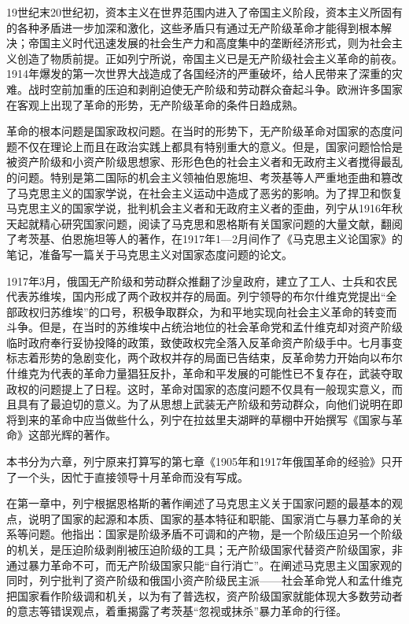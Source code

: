 \documentclass[UTF8, 12pt, a4paper]{ctexrep}
\begin{document}
19世纪末20世纪初，资本主义在世界范围内进入了帝国主义阶段，资本主义所固有的各种矛盾进一步加深和激化，这些矛盾只有通过无产阶级革命才能得到根本解决；帝国主义时代迅速发展的社会生产力和高度集中的垄断经济形式，则为社会主义创造了物质前提。正如列宁所说，帝国主义已是无产阶级社会主义革命的前夜。1914年爆发的第一次世界大战造成了各国经济的严重破坏，给人民带来了深重的灾难。战时空前加重的压迫和剥削迫使无产阶级和劳动群众奋起斗争。欧洲许多国家在客观上出现了革命的形势，无产阶级革命的条件日趋成熟。

革命的根本问题是国家政权问题。在当时的形势下，无产阶级革命对国家的态度问题不仅在理论上而且在政治实践上都具有特别重大的意义。但是，国家问题恰恰是被资产阶级和小资产阶级思想家、形形色色的社会主义者和无政府主义者搅得最乱的问题。特别是第二国际的机会主义领袖伯恩施坦、考茨基等人严重地歪曲和篡改了马克思主义的国家学说，在社会主义运动中造成了恶劣的影响。为了捍卫和恢复马克思主义的国家学说，批判机会主义者和无政府主义者的歪曲，列宁从1916年秋天起就精心研究国家问题，阅读了马克思和恩格斯有关国家问题的大量文献，翻阅了考茨基、伯恩施坦等人的著作，在1917年1—2月间作了《马克思主义论国家》的笔记，准备写一篇关于马克思主义对国家态度问题的论文。

1917年3月，俄国无产阶级和劳动群众推翻了沙皇政府，建立了工人、士兵和农民代表苏维埃，国内形成了两个政权并存的局面。列宁领导的布尔什维克党提出“全部政权归苏维埃”的口号，积极争取群众，为和平地实现向社会主义革命的转变而斗争。但是，在当时的苏维埃中占统治地位的社会革命党和孟什维克却对资产阶级临时政府奉行妥协投降的政策，致使政权完全落入反革命资产阶级手中。七月事变标志着形势的急剧变化，两个政权并存的局面已告结束，反革命势力开始向以布尔什维克为代表的革命力量猖狂反扑，革命和平发展的可能性已不复存在，武装夺取政权的问题提上了日程。这时，革命对国家的态度问题不仅具有一般现实意义，而且具有了最迫切的意义。为了从思想上武装无产阶级和劳动群众，向他们说明在即将到来的革命中应当做些什么，列宁在拉兹里夫湖畔的草棚中开始撰写《国家与革命》这部光辉的著作。

本书分为六章，列宁原来打算写的第七章《1905年和1917年俄国革命的经验》只开了一个头，因忙于直接领导十月革命而没有写成。

在第一章中，列宁根据恩格斯的著作阐述了马克思主义关于国家问题的最基本的观点，说明了国家的起源和本质、国家的基本特征和职能、国家消亡与暴力革命的关系等问题。他指出：国家是阶级矛盾不可调和的产物，是一个阶级压迫另一个阶级的机关，是压迫阶级剥削被压迫阶级的工具；无产阶级国家代替资产阶级国家，非通过暴力革命不可，而无产阶级国家只能“自行消亡”。在阐述马克思主义国家观的同时，列宁批判了资产阶级和俄国小资产阶级民主派——社会革命党人和孟什维克把国家看作阶级调和机关，以为有了普选权，资产阶级国家就能体现大多数劳动者的意志等错误观点，着重揭露了考茨基“忽视或抹杀”暴力革命的行径。
\end{document}
